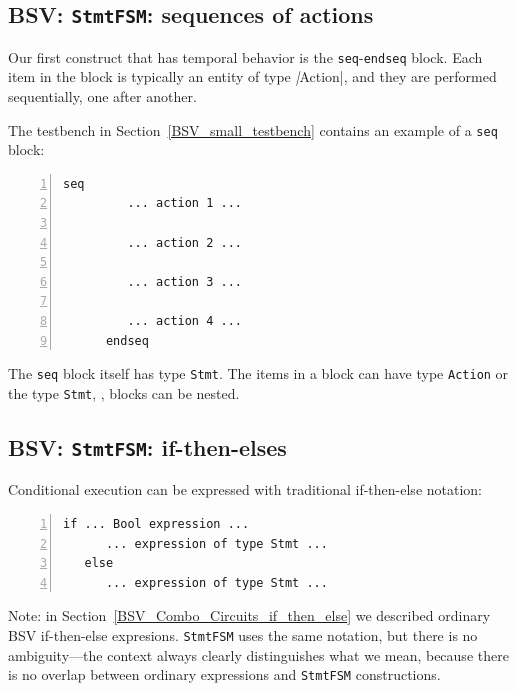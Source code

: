 
\subsection{BSV: {\tt StmtFSM}: sequences of actions}


Our first construct that has temporal behavior is the
\verb|seq|-\verb|endseq| block.  Each item in the block is typically
an entity of type \emph|Action|, and they are performed sequentially,
one after another.

The testbench in Section~\ref{BSV_small_testbench} contains an example
of a \verb|seq| block:
\begin{Verbatim}[frame=single, numbers=left]
      seq
         ... action 1 ...

         ... action 2 ...

         ... action 3 ...

         ... action 4 ...
      endseq
\end{Verbatim}


The \verb|seq| block itself has type \verb|Stmt|.  The items in a
block can have type \verb|Action| or the type \verb|Stmt|, {\ie},
blocks can be nested.


\subsection{BSV: {\tt StmtFSM}: if-then-elses}


Conditional execution can be expressed with traditional if-then-else notation:
\begin{Verbatim}[frame=single, numbers=left]
   if ... Bool expression ...
      ... expression of type Stmt ...
   else
      ... expression of type Stmt ...
\end{Verbatim}

Note: in Section~\ref{BSV_Combo_Circuits_if_then_else} we described
ordinary BSV if-then-else expresions.  \verb|StmtFSM| uses the same
notation, but there is no ambiguity---the context always clearly
distinguishes what we mean, because there is no overlap between
ordinary expressions and \verb|StmtFSM| constructions.

